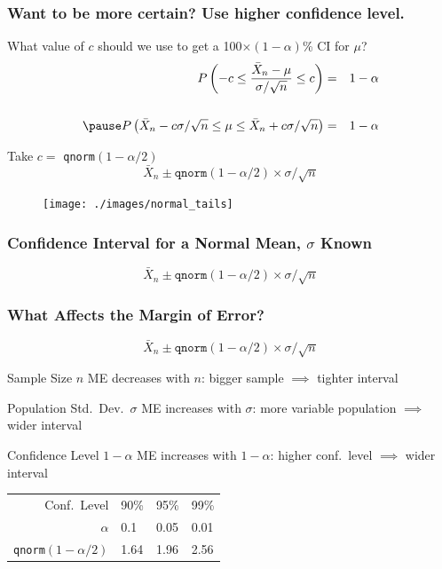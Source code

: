 \documentclass{beamer}
\begin{document}
\begin{frame}
\frametitle{Want to be more certain? Use higher confidence level.}
What value of $c$ should we use to get a 100$\times(1-\alpha)$\% CI for $\mu$?
	\begin{eqnarray*}
		P\left(-c \leq \frac{\bar{X}_n-\mu}{\sigma/\sqrt{n}} \leq c \right) &=& 1-\alpha \\ \\ \pause
		P\left(\bar{X}_n - c \sigma/\sqrt{n} \leq \mu\leq \bar{X}_n + c \sigma/\sqrt{n} \right) &=& 1-\alpha 
	\end{eqnarray*}
 \pause

\alert{Take $c =$ \texttt{qnorm}$(1-\alpha/2)$} \pause
	$$\bar{X}_n \pm \texttt{qnorm}(1-\alpha/2) \times \sigma/\sqrt{n}$$
\end{frame}

\begin{frame}
\begin{figure}
\centering
\texttt{[image: ./images/normal\_tails]}
\end{figure}
\end{frame}
\begin{frame}
\frametitle{Confidence Interval for a Normal Mean, $\sigma$ Known}
\Large
$$\boxed{\bar{X}_n \pm \texttt{qnorm}(1-\alpha/2) \times \sigma/\sqrt{n}}$$
\end{frame}

\begin{frame}
\frametitle{What Affects the Margin of Error?}

	$$\boxed{\bar{X}_n \pm \texttt{qnorm}(1-\alpha/2) \times \sigma/\sqrt{n}}$$


	
\begin{block}{Sample Size $n$}
ME decreases with $n$: bigger sample $\implies$ tighter interval
\end{block}


\begin{block}{Population Std.\ Dev.\ $\sigma$}
ME increases with $\sigma$: more variable population $\implies$ wider interval
\end{block}



\begin{block}{Confidence Level $1-\alpha$}
ME increases with $1-\alpha$: higher conf.\ level $\implies$ wider interval

\pause

\vspace{1em}
\centering
	\begin{tabular}{r|lll}
	\hline
	Conf.\ Level & 90\% & 95\% & 99\% \\
	$\alpha$ & 0.1 & 0.05 & 0.01\\
	\texttt{qnorm}$(1-\alpha/2)$&1.64 & 1.96 & 2.56\\
	\hline
	\end{tabular}
\end{block}	
\end{frame}
\end{document}
